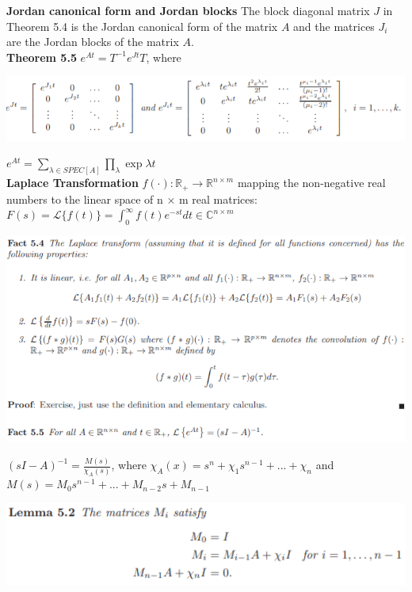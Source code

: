 \documentclass[10pt,landscape]{article}
\newenvironment{Figure}
{\par\medskip\noindent\minipage{\linewidth}}
{\endminipage\par\medskip}
\begin{document}
\begin{multicols*}{4}
\textbf{Jordan canonical form and Jordan blocks} The block diagonal matrix $J$ in Theorem 5.4 is the Jordan canonical form of the
matrix $A$ and the matrices $J_i$ are the Jordan blocks of the matrix $A$.\\

\textbf{Theorem 5.5} $e^{At} = T^{-1}e^{Jt}T$, where
\begin{Figure}
	\centering
	\includegraphics[width=\linewidth]{pictures/Th5_5.png}
\end{Figure}

$e^{At} = \sum_{\lambda \in SPEC[A]} \prod_\lambda \exp{\lambda t}$\\

\textbf{Laplace Transformation} $f(\cdot): \mathbb{R}_+ \rightarrow \mathbb{R}^{n \times m}$ mapping the non-negative real numbers to the linear space of n × m real matrices: $F(s) = \mathcal{L} \{f(t) \} = \int_0^\infty f(t)e^{-st}dt \in \mathbb{C}^{n \times m}$\\

\begin{Figure}
	\centering
	\includegraphics[width=\linewidth]{pictures/Fac5_5.png}
\end{Figure}

$(sI-A)^{-1} = \frac{M(s)}{\chi_A(s)}$, where $\chi_A(x) = s^n + \chi_1 s^{n-1} + ... + \chi_n$ and $M(s) = M_0 s^{n-1} + ... + M_{n-2}s + M_{n-1}$\\

\begin{Figure}
	\centering
	\includegraphics[width=\linewidth]{pictures/Lem5_2.png}
\end{Figure}


\end{multicols*}
\end{document}
